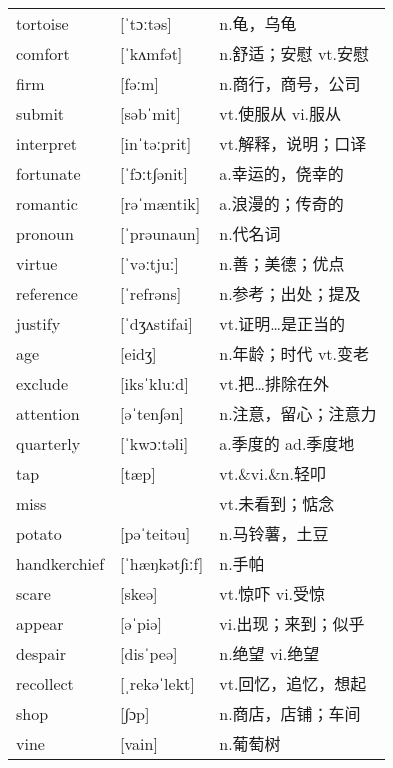 \documentclass[a4paper]{article}
\begin{document}
\section{}
\begin{tabular}{l l l}

tortoise & [ˈtɔːtəs] & n.龟，乌龟 \\
comfort & [ˈkʌmfət] & n.舒适；安慰 vt.安慰 \\
firm & [fəːm] & n.商行，商号，公司 \\
submit & [səbˈmit] & vt.使服从 vi.服从 \\
interpret & [inˈtəːprit] & vt.解释，说明；口译 \\
fortunate & [ˈfɔːt∫ənit] & a.幸运的，侥幸的 \\
romantic & [rəˈmæntik] & a.浪漫的；传奇的 \\
pronoun & [ˈprəunaun] & n.代名词 \\
virtue & [ˈvəːtjuː] & n.善；美德；优点 \\
reference & [ˈrefrəns] & n.参考；出处；提及 \\
justify & [ˈdʒʌstifai] & vt.证明…是正当的 \\
age & [eidʒ] & n.年龄；时代 vt.变老 \\
exclude & [iksˈkluːd] & vt.把…排除在外 \\
attention & [əˈten∫ən] & n.注意，留心；注意力 \\
quarterly & [ˈkwɔːtəli] & a.季度的 ad.季度地 \\
tap & [tæp] & vt.\&vi.\&n.轻叩 \\
miss &  & vt.未看到；惦念 \\
potato & [pəˈteitəu] & n.马铃薯，土豆 \\
handkerchief & [ˈhæŋkət∫iːf] & n.手帕 \\
scare & [skeə] & vt.惊吓 vi.受惊 \\
appear & [əˈpiə] & vi.出现；来到；似乎 \\
despair & [disˈpeə] & n.绝望 vi.绝望 \\
recollect & [ˌrekəˈlekt] & vt.回忆，追忆，想起 \\
shop & [∫ɔp] & n.商店，店铺；车间 \\
vine & [vain] & n.葡萄树 \\

\end{tabular}
\end{document}
